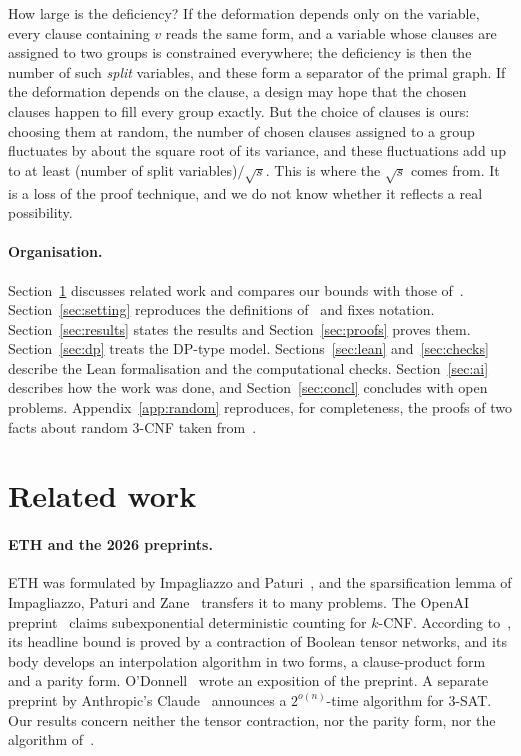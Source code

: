 \documentclass[11pt,a4paper]{article}
\theoremstyle{definition}
\theoremstyle{remark}
\begin{document}
How large is the deficiency? If the deformation depends only on the variable, every clause
containing $v$ reads the same form, and a variable whose clauses are assigned to two groups
is constrained everywhere; the deficiency is then the number of such \emph{split} variables,
and these form a separator of the primal graph. If the deformation depends on the clause, a
design may hope that the chosen clauses happen to fill every group exactly. But the choice of
clauses is ours: choosing them at random, the number of chosen clauses assigned to a group
fluctuates by about the square root of its variance, and these fluctuations add up to at
least (number of split variables)$/\sqrt{s}$. This is where the $\sqrt s$ comes from. It is a
loss of the proof technique, and we do not know whether it reflects a real possibility.

\paragraph{Organisation.} Section~\ref{sec:related} discusses related work and compares our
bounds with those of~\cite{DL}. Section~\ref{sec:setting} reproduces the definitions
of~\cite{DL} and fixes notation. Section~\ref{sec:results} states the results and
Section~\ref{sec:proofs} proves them. Section~\ref{sec:dp} treats the DP-type model.
Sections~\ref{sec:lean} and~\ref{sec:checks} describe the Lean formalisation and the
computational checks. Section~\ref{sec:ai} describes how the work was done, and
Section~\ref{sec:concl} concludes with open problems. Appendix~\ref{app:random} reproduces,
for completeness, the proofs of two facts about random 3-CNF taken from~\cite{DL}.

\section{Related work}\label{sec:related}

\paragraph{ETH and the 2026 preprints.} ETH was formulated by Impagliazzo and
Paturi~\cite{IP01}, and the sparsification lemma of Impagliazzo, Paturi and Zane~\cite{IPZ01}
transfers it to many problems. The OpenAI preprint~\cite{OpenAI} claims subexponential
deterministic counting for $k$-CNF. According to~\cite{DL}, its headline bound is proved by a
contraction of Boolean tensor networks, and its body develops an interpolation algorithm in
two forms, a clause-product form and a parity form. O'Donnell~\cite{ODonnell} wrote an
exposition of the preprint. A separate preprint by Anthropic's Claude~\cite{Claude} announces a
$2^{o(n)}$-time algorithm for 3-SAT. Our results concern neither the tensor contraction, nor
the parity form, nor the algorithm of~\cite{Claude}.
\end{document}
